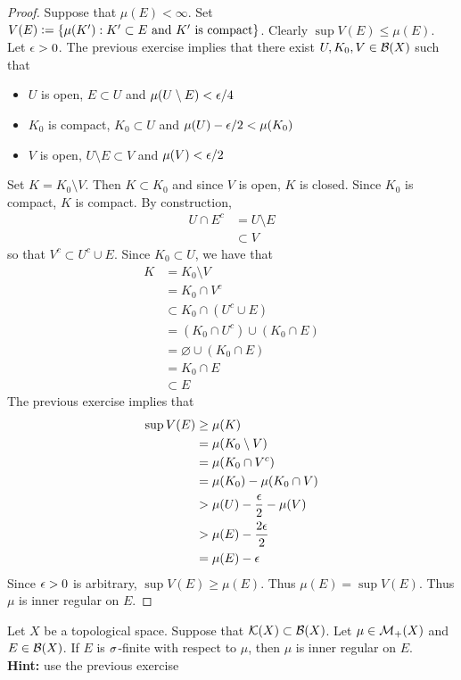 \documentclass{book}
\begin{document}
	\begin{proof}
		Suppose that $\mu(E) < \infty$. Set $ V(E) \vcentcolon= \{\mu(K'): K' \subset E \text{ and $K'$ is compact} \}$. Clearly $\sup V(E) \leq \mu(E)$. Let $\epsilon > 0$. The previous exercise implies that there exist $U,K_0,V \in \mathcal{B}(X)$ such that 
		\begin{itemize}
			\item $U$ is open, $E \subset U$ and $\mu(U \setminus E) < \epsilon/4$
			\item  $K_0$ is compact, $K_0 \subset U$ and $\mu(U) - \epsilon/2 < \mu(K_0)$
			\item $V$ is open, $U \setminus E \subset V$ and $\mu(V) < \epsilon/2$
		\end{itemize}
		Set $K = K_0 \setminus V$. Then $K \subset K_0$ and since $V$ is open, $K$ is closed. Since $K_0$ is compact, $K$ is compact. By construction, 
		\begin{align*}
			U \cap E^c 
			& = U \setminus E \\
			& \subset V
		\end{align*} 
		so that $V^c \subset U^c \cup E$. Since $K_0 \subset U$, we have that 
		\begin{align*}
			K
			& = K_0 \setminus V \\
			& = K_0 \cap V^c \\
			& \subset K_0 \cap (U^c \cup E) \\
			& = (K_0 \cap U^c) \cup (K_0 \cap E) \\
			& = \varnothing \cup (K_0 \cap E) \\
			& = K_0 \cap E \\
			& \subset E
		\end{align*}
		The previous exercise implies that 
		\begin{align*}
			\sup V(E)
			& \geq \mu(K) \\
			& = \mu(K_0 \setminus V) \\
			& = \mu(K_0 \cap V^c) \\
			& = \mu(K_0) - \mu(K_0 \cap V) \\
			& > \mu(U) - \frac{\epsilon}{2} - \mu(V) \\
			& > \mu(E) - \frac{2\epsilon}{2} \\
			& = \mu(E) - \epsilon 
		\end{align*}
		Since $\epsilon >0$ is arbitrary, $\sup V(E) \geq \mu(E)$. Thus $\mu(E) = \sup V(E)$. Thus $\mu$ is inner regular on $E$. 
	\end{proof}		
	
	\begin{ex}  
		Let $X$ be a topological space. Suppose that $\mathcal{K}(X) \subset \mathcal{B}(X)$. Let $\mu \in \mathcal{M}_+(X)$ and $E \in \mathcal{B}(X)$. If $E$ is $\sigma$-finite with respect to $\mu$, then $\mu$ is inner regular on $E$. \\
		\textbf{Hint:} use the previous exercise
	\end{ex}
	
\end{document}
